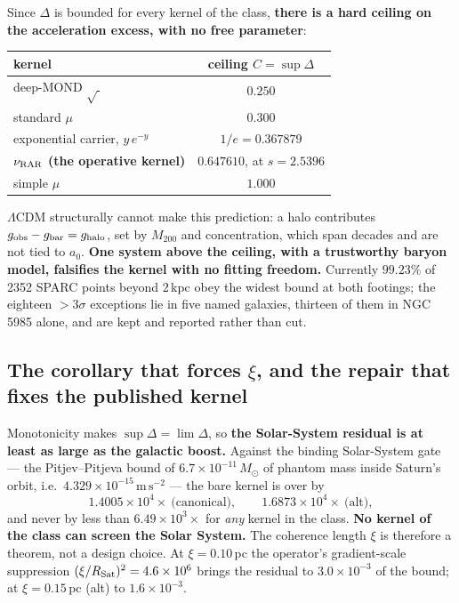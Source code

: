 \documentclass[11pt,letterpaper]{article}
\newcommand{\ms}{\,\mathrm{m\,s^{-2}}}
\begin{document}
Since $\Delta$ is bounded for every kernel of the class, \textbf{there is a hard ceiling on the acceleration excess, with no free parameter}:

\begin{center}
\begin{tabular}{lc}\toprule
kernel & ceiling $C=\sup\Delta$\\\midrule
deep-MOND $\sqrt{\ }$ & $0.250$\\
standard $\mu$ & $0.300$\\
exponential carrier, $y\,e^{-y}$ & $1/e=0.367879$\\
\textbf{$\nu_{\rm RAR}$ (the operative kernel)} \cite{rar} & \textbf{$0.647610$}, at $s=2.5396$\\
simple $\mu$ & $1.000$\\\bottomrule
\end{tabular}
\end{center}

$\Lambda$CDM structurally cannot make this prediction: a halo \cite{nfw} contributes $g_{\rm obs}-g_{\rm bar}=g_{\rm halo}$, set by $M_{200}$ and concentration, which span decades and are not tied to $a_0$. \textbf{One system above the ceiling, with a trustworthy baryon model, falsifies the kernel with no fitting freedom.} Currently $99.23\%$ of 2352 SPARC \cite{sparc} points beyond 2\,kpc obey the widest bound at both footings; the eighteen $>3\sigma$ exceptions lie in five named galaxies, thirteen of them in NGC\,5985 alone, and are kept and reported rather than cut.

\subsection{The corollary that forces $\xi$, and the repair that fixes the published kernel}
Monotonicity makes $\sup\Delta=\lim\Delta$, so \textbf{the Solar-System residual is at least as large as the galactic boost.} Against the binding Solar-System gate --- the Pitjev--Pitjeva bound \cite{pitjev13} of $6.7\times10^{-11}\,M_\odot$ of phantom mass inside Saturn's orbit, i.e.\ $4.329\times10^{-15}\ms$ --- the bare kernel is over by
\begin{equation}
1.4005\times10^{4}\times\ \text{(canonical)},\qquad 1.6873\times10^{4}\times\ \text{(alt)},
\end{equation}
and never by less than $6.49\times10^{3}\times$ for \emph{any} kernel in the class. \textbf{No kernel of the class can screen the Solar System.} The coherence length $\xi$ is therefore a theorem, not a design choice. At $\xi=0.10$\,pc the operator's gradient-scale suppression $(\xi/R_{\rm Sat})^2=4.6\times10^{6}$ brings the residual to $3.0\times10^{-3}$ of the bound; at $\xi=0.15$\,pc (alt) to $1.6\times10^{-3}$.
\end{document}
